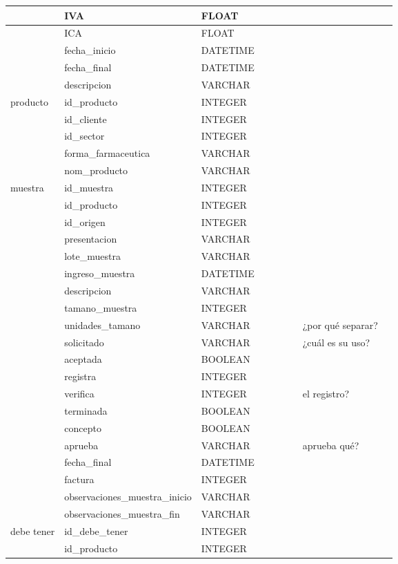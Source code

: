 \documentclass[letterpaper,10pt,spanish]{sphinxmanual}
\begin{document}
\begin{savenotes}
\begin{longtable}[c]{|l|l|l|l|l|l|l|l|l|}
\hline&
IVA
&
FLOAT
&&&&&&\\
\hline&
ICA
&
FLOAT
&&&&&&\\
\hline&
fecha\_inicio
&
DATETIME
&&&&&&\\
\hline&
fecha\_final
&
DATETIME
&&&&&&\\
\hline&
descripcion
&
VARCHAR
&&&&&&\\
\hline
producto
&
id\_producto
&
INTEGER
&&&&&&\\
\hline&
id\_cliente
&
INTEGER
&&&&&&\\
\hline&
id\_sector
&
INTEGER
&&&&&&\\
\hline&
forma\_farmaceutica
&
VARCHAR
&&&&&&\\
\hline&
nom\_producto
&
VARCHAR
&&&&&&\\
\hline
muestra
&
id\_muestra
&
INTEGER
&&&&&&\\
\hline&
id\_producto
&
INTEGER
&&&&&&\\
\hline&
id\_origen
&
INTEGER
&&&&&&\\
\hline&
presentacion
&
VARCHAR
&&&&&&\\
\hline&
lote\_muestra
&
VARCHAR
&&&&&&\\
\hline&
ingreso\_muestra
&
DATETIME
&&&&&&\\
\hline&
descripcion
&
VARCHAR
&&&&&&\\
\hline&
tamano\_muestra
&
INTEGER
&&&&&&\\
\hline&
unidades\_tamano
&
VARCHAR
&&&&&
¿por qué separar?
&\\
\hline&
solicitado
&
VARCHAR
&&&&&
¿cuál es su uso?
&\\
\hline&
aceptada
&
BOOLEAN
&&&&&&\\
\hline&
registra
&
INTEGER
&&&&&&\\
\hline&
verifica
&
INTEGER
&&&&&
el registro?
&\\
\hline&
terminada
&
BOOLEAN
&&&&&&\\
\hline&
concepto
&
BOOLEAN
&&&&&&\\
\hline&
aprueba
&
VARCHAR
&&&&&
aprueba qué?
&\\
\hline&
fecha\_final
&
DATETIME
&&&&&&\\
\hline&
factura
&
INTEGER
&&&&&&\\
\hline&
observaciones\_muestra\_inicio
&
VARCHAR
&&&&&&\\
\hline&
observaciones\_muestra\_fin
&
VARCHAR
&&&&&&\\
\hline
debe tener
&
id\_debe\_tener
&
INTEGER
&&&&&&\\
\hline&
id\_producto
&
INTEGER

\end{longtable}
\end{savenotes}
\end{document}
